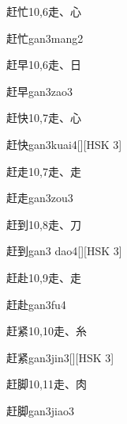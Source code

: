 \begin{entry}{赶忙}{10,6}{⾛、⼼}
  \begin{phonetics}{赶忙}{gan3mang2}
  \end{phonetics}
\end{entry}

\begin{entry}{赶早}{10,6}{⾛、⽇}
  \begin{phonetics}{赶早}{gan3zao3}
  \end{phonetics}
\end{entry}

\begin{entry}{赶快}{10,7}{⾛、⼼}
  \begin{phonetics}{赶快}{gan3kuai4}[][HSK 3]
  \end{phonetics}
\end{entry}

\begin{entry}{赶走}{10,7}{⾛、⾛}
  \begin{phonetics}{赶走}{gan3zou3}
  \end{phonetics}
\end{entry}

\begin{entry}{赶到}{10,8}{⾛、⼑}
  \begin{phonetics}{赶到}{gan3 dao4}[][HSK 3]
  \end{phonetics}
\end{entry}

\begin{entry}{赶赴}{10,9}{⾛、⾛}
  \begin{phonetics}{赶赴}{gan3fu4}
  \end{phonetics}
\end{entry}

\begin{entry}{赶紧}{10,10}{⾛、⽷}
  \begin{phonetics}{赶紧}{gan3jin3}[][HSK 3]
  \end{phonetics}
\end{entry}

\begin{entry}{赶脚}{10,11}{⾛、⾁}
  \begin{phonetics}{赶脚}{gan3jiao3}
  \end{phonetics}
\end{entry}

